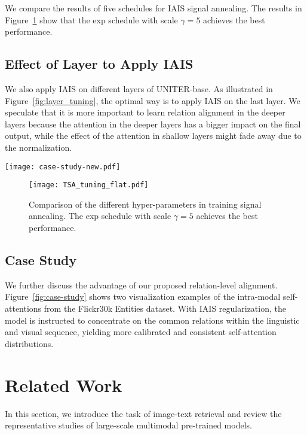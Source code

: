 \documentclass[11pt,a4paper]{article}
\begin{document}
We compare the results of five schedules for IAIS signal annealing. 
The results in Figure~\ref{fig:tsa-tuning} show that the exp schedule with scale $\gamma=5$ achieves the best performance.
\subsection{Effect of Layer to Apply IAIS}
We also apply IAIS on different layers of UNITER-base. 
As illustrated in Figure~\ref{fig:layer_tuning}, the optimal way is to apply IAIS on the last layer.
We speculate that it is more important to learn relation alignment in the deeper layers because the attention in the deeper layers has a bigger impact on the final output, while the effect of the attention in shallow layers might fade away due to the normalization.

\begin{figure*}[t!]
    \centering
    \texttt{[image: case-study-new.pdf]}
    \caption{Visualization of intra-modal self-attentions with and without our IAIS method.}
    \label{fig:case-study}
\end{figure*}

\begin{figure}[t!]
    \centering
    \texttt{[image: TSA\_tuning\_flat.pdf]}
    \caption{Comparison of the different hyper-parameters in training signal annealing. The exp schedule with scale $\gamma=5$ achieves the best performance.}
    \label{fig:tsa-tuning}
\end{figure}

\subsection{Case Study}
We further discuss the advantage of our proposed relation-level alignment. 
Figure~\ref{fig:case-study} shows two visualization examples of the intra-modal self-attentions from the Flickr30k Entities dataset. 
With IAIS regularization, the model is instructed to concentrate on the common relations within the linguistic and visual sequence, yielding more calibrated and consistent self-attention distributions. 

\section{Related Work}
In this section, we introduce the task of image-text retrieval and review the representative studies of large-scale multimodal pre-trained models.
\end{document}
